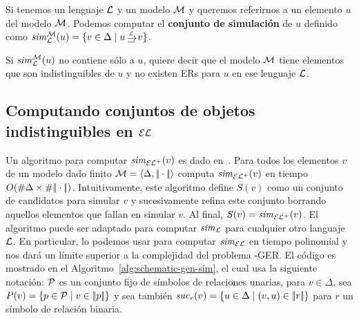 Si tenemos un lenguaje $\mathcal{L}$ y un modelo $\mathcal{M}$ y queremos referirnos a un elemento $u$ del modelo $\mathcal{M}$. Podemos computar el {\bf conjunto de simulaci\'on} de $u$ definido como
$\simset_{\+L}^{\+M}(u) = \cset{v \in \Delta \mid u \simul{\+L} v}$.

 Si ${\it sim}_{\mathcal{L}}^{\mathcal{M}}(u)$ no contiene s\'olo a $u$, quiere decir que el modelo $\mathcal{M}$ tiene elementos que son indistinguibles de $u$ y no existen ERs para $u$ en ese lenguaje $\mathcal{L}$.
%

\subsection{Computando conjuntos de objetos indistinguibles en $\mathcal{EL}$}

Un algoritmo para computar ${\it sim}_{{\mathcal{EL}^+}}(v)$ es dado en~\cite{HHK95}. Para todos los
elementos $v$ de un modelo dado finito
$\mathcal{M}=\langle \Delta,|\!|\cdot|\!| \rangle$
computa ${\it sim}_{{\mathcal{EL}^+}}(v)$ en tiempo $O(\# \Delta\times\# {|\!|\cdot|\!|})$.
Intuitivamente, este algoritmo
define $S(v)$ como un conjunto de candidatos para simular $v$ y
sucesivamente refina este conjunto borrando aquellos elementos que fallan en simular $v$.
Al final, $S(v)={\it sim}_{\mathcal{EL}^+}(v)$. El algoritmo puede ser adaptado para
computar ${\it sim}_{\mathcal{L}}$ para cualquier otro languaje $\mathcal{L}$. En particular,
lo podemos usar para computar ${\it sim}_\mathcal{EL}$ en tiempo polinomial y nos dar\'a un l\'imite superior a la
complejidad del problema \EL-GER. 
El c\'odigo es mostrado en el
Algoritmo~\ref{alg:schematic-gen-sim}, el cual usa la siguiente
notaci\'on: $\mathcal{P}$ es un conjunto fijo de s\'imbolos de relaciones unarias, para $v\in
\Delta$, sea $P(v)=\{p\in\mathcal{P}\mid v\in|\!|p|\!|\}$ y sea tambi\'en
${\it suc}_{r}(v)=\{u\in\Delta\mid(v,u)\in|\!|r|\!|\}$ para $r$ un s\'imbolo de relaci\'on binaria.\\


